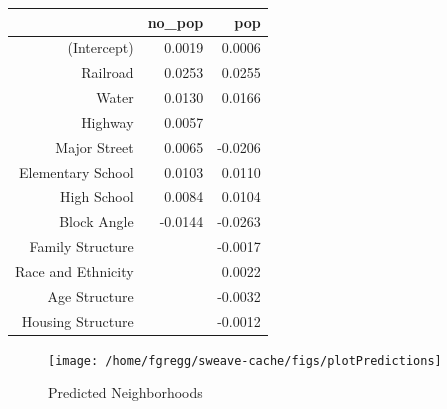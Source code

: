 \documentclass[12pt,letter]{article}\usepackage[]{graphicx}\usepackage[]{color}
\newenvironment{knitrout}{}{} %
\begin{document}
\begin{table}[ht]
\centering
\begin{tabular}{rrr}
  \hline
 & no\_pop & pop \\ 
  \hline
(Intercept) & 0.0019 & 0.0006 \\ 
  Railroad & 0.0253 & 0.0255 \\ 
  Water & 0.0130 & 0.0166 \\ 
  Highway & 0.0057 &  \\ 
  Major Street & 0.0065 & -0.0206 \\ 
  Elementary School & 0.0103 & 0.0110 \\ 
  High School & 0.0084 & 0.0104 \\ 
  Block Angle & -0.0144 & -0.0263 \\ 
  Family Structure &  & -0.0017 \\ 
  Race and Ethnicity &  & 0.0022 \\ 
  Age Structure &  & -0.0032 \\ 
  Housing Structure &  & -0.0012 \\ 
   \hline
\end{tabular}
\end{table}




\begin{figure}
\begin{knitrout}
\color{fgcolor}

{\centering \texttt{[image: /home/fgregg/sweave-cache/figs/plotPredictions]} 

}



\end{knitrout}

\caption{Predicted Neighborhoods}
\end{figure}
\end{document}
